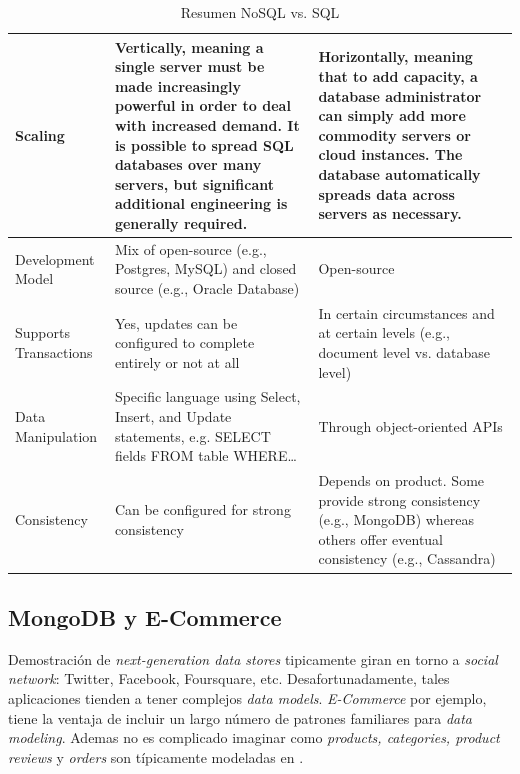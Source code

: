 \begin{table}[h!]
\begin{tabular}{ |L{0.1\paperwidth}|L{0.3\paperwidth}|L{0.3\paperwidth}|}
\\ \hline
	Scaling&
	Vertically, meaning a single server must be made increasingly powerful in order to deal with increased demand. It is possible to spread SQL databases over many servers, but significant additional engineering is generally required.&
	Horizontally, meaning that to add capacity, a database administrator can simply add more commodity servers or cloud instances. The database automatically spreads data across servers as necessary.
	
\\ \hline
	Development Model&
	Mix of open-source (e.g., Postgres, MySQL) and closed source (e.g., Oracle Database)&
	Open-source
	
\\ \hline
	Supports Transactions&
	Yes, updates can be configured to complete entirely or not at all&
	In certain circumstances and at certain levels (e.g., document level vs. database level)
	
\\ \hline
	Data Manipulation&
	Specific language using Select, Insert, and Update statements, e.g. SELECT fields FROM table WHERE…&
	Through object-oriented APIs

\\ \hline
	Consistency&
	Can be configured for strong consistency&
	Depends on product. Some provide strong consistency (e.g., MongoDB) whereas others offer eventual consistency (e.g., Cassandra)

\\ \hline
\end{tabular}
    \caption{ Resumen NoSQL vs. SQL}
    \label{tab:SQL_vs_noSQL_summary}
\end{table}

\subsection{MongoDB y E-Commerce \cite{online_mongodb_ecommerce}}
\label{cap:justificacion_proyecto:MongoDB_ECommerce}

Demostración de \textit{next-generation data stores} tipicamente giran en torno a \textit{social network}: Twitter, Facebook, Foursquare, etc. Desafortunadamente, tales aplicaciones tienden a tener complejos \textit{data models}. \textit{E-Commerce} por ejemplo, tiene la ventaja de incluir un largo número de patrones familiares para \textit{data modeling}. Ademas no es complicado imaginar como \textit{products, categories, product reviews} y \textit{orders} son típicamente modeladas en .

